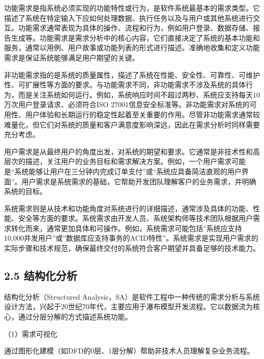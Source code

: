 
功能需求是指系统必须实现的功能特性或行为，是软件系统最基本的需求类型。它描述了系统在特定输入下应如何处理数据、执行任务以及与用户或其他系统进行交互。功能需求通常表现为具体的操作、流程和行为，例如用户登录、数据存储、报告生成等。功能需求是需求分析中的核心内容，它们直接决定了系统的基本功能和服务，通常以用例、用户故事或功能列表的形式进行描述。准确地收集和定义功能需求是保证系统能够满足用户期望的关键。


非功能需求指的是系统的质量属性，描述了系统在性能、安全性、可靠性、可维护性、可扩展性等方面的要求。与功能需求不同，非功能需求不涉及系统的具体行为，而是关注系统如何运行。例如，系统响应时间不超过两秒、系统应支持每天10万次用户登录请求、必须符合ISO 27001信息安全标准等。非功能需求对系统的可用性、用户体验和长期运行的稳定性起着至关重要的作用。尽管非功能需求通常较难量化，但它们对系统的质量和客户满意度影响深远，因此在需求分析时同样需要充分考虑。


用户需求是从最终用户的角度出发，对系统的期望和要求。它通常是非技术性和高层次的描述，关注用户的业务目标和需求解决方案。例如，一个用户需求可能是``系统能够让用户在三分钟内完成订单支付''或``系统应具备简洁直观的用户界面''。用户需求是系统需求的基础，它帮助开发团队理解客户的业务需求，并明确系统的目标。

系统需求则是从技术和功能角度对系统进行的详细描述，通常涉及具体的功能、性能、安全等方面的要求。系统需求由开发人员、系统架构师等技术团队根据用户需求转化而来，通常更加具体和可操作。例如，系统需求可能包括''系统应支持10,000并发用户''或''数据库应支持事务的ACID特性''。系统需求是实现用户需求的实际步骤和技术规范，确保最终交付的系统符合客户期望并具备足够的技术能力。

\hypertarget{ux7ed3ux6784ux5316ux5206ux6790}{%
\subsection{2.5 结构化分析}\label{ux7ed3ux6784ux5316ux5206ux6790}}

结构化分析（Structured Analysis，SA）是软件工程中一种传统的需求分析与系统设计方法，兴起于20世纪70年代，主要应用于瀑布模型开发流程。它以数据流为核心，通过分层分解的方式描述系统功能。


（1）需求可视化

通过图形化建模（如DFD的0层、1层分解）帮助非技术人员理解复杂业务流程。

